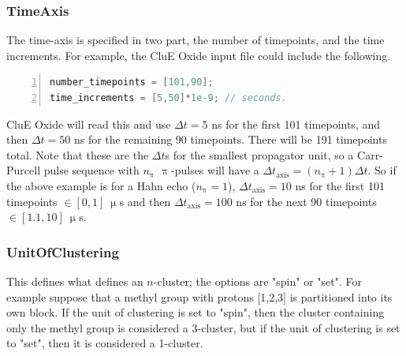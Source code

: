 \documentclass{book}
\begin{document}
\subsubsection{TimeAxis} %
The time-axis is specified in two part, the number of timepoints, and 
the time increments.  For example, the CluE Oxide input file could include the
following.  
\begin{lstlisting}[frame=single,numbers=left,language=c]
number_timepoints = [101,90];
time_increments = [5,50]*1e-9; // seconds.
\end{lstlisting}
CluE Oxide will read this and use $\Delta t = 5$ ns for the first 101 timepoints,
and then $\Delta t = 50$ ns for the remaining 90 timepoints.  
There will be 191 timepoints total.  Note that these are the $\Delta t$s for 
the smallest propagator unit, so a Carr-Purcell pulse sequence with $n_\uppi$
$\uppi$-pulses will have a $\Delta t_\text{axis} = (n_\uppi +1 )\Delta t$.
So if the above example is for a Hahn echo ($n_\uppi = 1$), 
$\Delta t_\text{axis} = 10$ ns for the first 101 timepoints $\in [0, 1]\ \upmu$s 
and then $\Delta t_\text{axis} = 100$ ns for the next 90 timepoints
$\in [1.1, 10]\ \upmu$s.

\subsubsection{UnitOfClustering} %
This defines what defines an $n$-cluster; the options are "spin" or "set".
For example suppose that a methyl group with protons [1,2,3] is partitioned
into its own block.  If the unit of clustering is set to "spin", then the 
cluster containing only the methyl group is considered a 3-cluster,
but if the unit of clustering is set to "set", then it is considered 
a 1-cluster.
\end{document}
